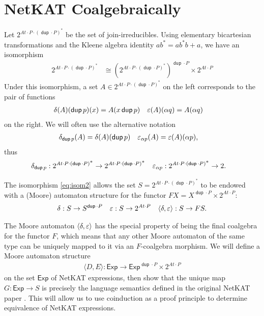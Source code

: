 \documentclass{article}
\newcommand\At{\ensuremath{\mathit{At}}}
\newcommand\pdup{\mathop{\mathsf{dup}}}
\newcommand\Exp{\mathsf{Exp}}
\renewcommand\star{^{\textstyle *}}
\newcommand\pair[2]{\langle #1,#2\rangle}
\newcommand\setJI{2^{\At\cdot P\cdot(\pdup\cdot P)^{\scriptstyle *}}}
\begin{document}
\section{NetKAT Coalgebraically}

Let $\setJI$ be the set of join-irreducibles. Using elementary bicartesian transformations and the Kleene algebra identity $ab\star = ab\star b + a$, we have an isomorphism
\begin{align}
\setJI
&\cong (\setJI)^{\pdup\cdot P} \times 2^{\At\cdot P}\label{eq:isom2}
\end{align}
Under this isomorphism, a set $A\in\setJI$ on the left corresponds to the pair of functions
\begin{align*}
\delta(A)(\pdup p)(x) &= A(x\pdup p) &
\eps(A)(\alpha q) &= A(\alpha q)
\end{align*}
on the right. We will often use the alternative notation
\begin{align*}
\delta_{\pdup p}(A) &= \delta(A)(\pdup p) & \eps_{\alpha p}(A) &= \eps(A)(\alpha p),
\end{align*}
thus
\begin{align*}
\delta_{\pdup p} &: \setJI\fun\setJI & \eps_{\alpha p} &: \setJI\fun 2.
\end{align*}

The isomorphism \eqref{eq:isom2} allows the set $S = \setJI$ to be endowed with a (Moore) automaton structure for the functor $FX = X^{\pdup\cdot P} \times 2^{\At\cdot P}$: 
\begin{align*}
\delta &: S \to S^{\pdup \cdot P} & \eps &: S \to 2^{\At \cdot P} & \pair\delta\eps : S\fun FS.
\end{align*}

The Moore automaton $\pair\delta\eps$ has the special property of being the final coalgebra for the functor $F$, which means that any other Moore automaton of the same type can be uniquely mapped to it via an $F$-coalgebra morphism. We will define a Moore automaton structure
\begin{align*}
\pair DE : \Exp \to \Exp^{\pdup\cdot P} \times 2^{\At\cdot P}
\end{align*}
on the set $\Exp$ of NetKAT expressions, then show that the unique map $G:\Exp\to S$ is precisely the language semantics defined in the original NetKAT paper \cite{netkat}. This will allow us to use coinduction as a proof principle to determine equivalence of NetKAT expressions. 
\end{document}
